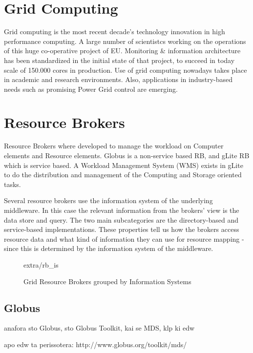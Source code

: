 \section{Grid Computing}
Grid computing \cite{li2005grid} is the most recent decade's technology
innovation in high performance computing. A large number of scientistcs working
on the operations of this huge co-operative project of EU. Monitoring \&
information architecture \cite{fisher2002datagrid} has been standardized in the
initial state of that project, to succeed in today scale of 150.000 cores in
production. Use of grid computing nowadays takes place in academic and research
environments. Also, applications in industry-based needs such as promising
Power Grid control \cite{Taylor2006} are emerging.

\section{Resource Brokers}
Resource Brokers \cite{Kertesz06ataxonomy} where developed to manage the
workload on Computer elements and Resource elements. Globus is a
non-service based RB, and gLite RB which is service based. A Workload
Management System (WMS) exists in gLite to do the distribution and management of
the Computing and Storage oriented tasks.

Several resource brokers use the information system of the underlying
middleware. In this case the relevant information from the brokers' view is the
data store and query. The two main subcategories are the directory-based and
service-based implementations. These properties tell us how the brokers access
resource data and what kind of information they can use for resource mapping -
since this is determined by the information system of the middleware.
\begin{figure}
\begin{center}
 {extra/rb_is}
\caption{Grid Resource Brokers grouped by Information
Systems\cite{Kertesz06ataxonomy}}
\end{center}
\end{figure}

\subsection{Globus}
anafora sto Globus, sto Globus Toolkit, kai se MDS, klp 
ki edw \cite{von1998usage,945188,zhang2004performance}

apo edw ta perissotera: http://www.globus.org/toolkit/mds/

